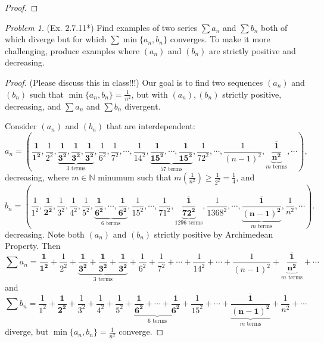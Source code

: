 \documentclass[11pt,twoside, reqno]{amsart}
\theoremstyle{remark}
\newtheorem{Prob}{Problem}
\def\N{\mathbb N}
\begin{document}
\begin{proof}
\end{proof}

\begin{Prob}(Ex. 2.7.11*) Find examples of two series $\sum a_n$ and $\sum b_n$ both of which diverge but for which $\sum \min \{a_n,b_n\}$ converges. To make it more challenging, produce examples where $(a_n)$ and $(b_n)$ are strictly positive and decreasing.
\end{Prob}

\begin{proof} (Please discuss this in class!!!)
Our goal is to find two sequences $(a_n)$ and $(b_n)$ such that $\min\{a_n,b_n\} = \frac{1}{n^2}$, but with $(a_n),(b_n)$ strictly positive, decreasing, and $\sum a_n$ and $\sum b_n$ divergent.

Consider $(a_n)$ and $(b_n)$ that are interdependent:
$$
    a_n = (\mathbf{\frac{1}{1^2}},\frac{1}{2^2},\underbrace{\mathbf{\frac{1}{3^2}, \frac{1}{3^2}, \frac{1}{3^2}}}_\text{$3$ terms},\frac{1}{6^2},\frac{1}{7^2}, \cdots, \frac{1}{14^2}, \underbrace{\mathbf{\frac{1}{15^2}, \cdots,\frac{1}{15^2}}}_\text{$57$ terms}, \frac{1}{72^2}, \cdots, \frac{1}{(n-1)^2}, \underbrace{\overline{\mathbf{\frac{1}{n^2}}}}_\text{$m$ terms}, \cdots),
$$
decreasing, where $m \in \N$ minumum such that $m(\frac{1}{n^2}) \geq \frac{1}{2^2} = \frac{1}{4}$, and
$$
    b_n = (\frac{1}{1^2},\mathbf{\frac{1}{2^2}},\frac{1}{3^2},\frac{1}{4^2},\frac{1}{5^2}, \underbrace{\mathbf{\frac{1}{6^2},\cdots,\frac{1}{6^2}}}_\text{$6$ terms}, \frac{1}{15^2}, \cdots, \frac{1}{71^2}, \underbrace{\overline{\mathbf{\frac{1}{72^2}}}}_\text{$1296$ terms}, \frac{1}{1368^2}, \cdots, \underbrace{\overline{\mathbf{\frac{1}{(n-1)^2}}}}_\text{$m$ terms}, \frac{1}{n^2}, \cdots).
$$
decreasing. Note both $(a_n)$ and $(b_n)$ strictly positive by Archimedean Property. Then
$$
    \sum a_n = \mathbf{\frac{1}{1^2}} + \frac{1}{2^2} + \underbrace{\mathbf{\frac{1}{3^2} + \frac{1}{3^2} + \frac{1}{3^2}}}_\text{$3$ terms} + \frac{1}{6^2} + \frac{1}{7^2} + \cdots + \frac{1}{14^2} + \cdots + \frac{1}{(n-1)^2} + \underbrace{\overline{\mathbf{\frac{1}{n^2}}}}_\text{$m$ terms} + \cdots
$$
and
$$
    \sum b_n = \frac{1}{1^2} + \mathbf{\frac{1}{2^2}} + \frac{1}{3^2} + \frac{1}{4^2} + \frac{1}{5^2} + \underbrace{\mathbf{\frac{1}{6^2} + \cdots + \frac{1}{6^2}}}_\text{$6$ terms} + \frac{1}{15^2} +  \cdots + \underbrace{\overline{\mathbf{\frac{1}{(n-1)^2}}}}_\text{$m$ terms} + \frac{1}{n^2} + \cdots
$$
diverge, but $\min \{a_n, b_n\} = \frac{1}{n^2}$ converge.

\end{proof}
\end{document}

